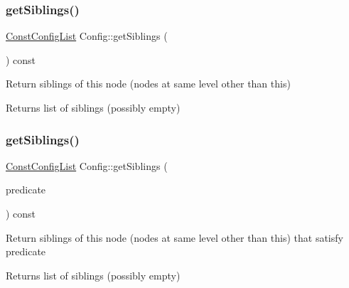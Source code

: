 \subsubsection{\texorpdfstring{get\+Siblings()}{getSiblings()}\hspace{0.1cm}{\footnotesize\ttfamily [1/2]}}
{\footnotesize\ttfamily \hyperlink{classtheoria_1_1config_1_1Config_a61230728ffa4d92667a536c8c0f0ca30}{Const\+Config\+List} Config\+::get\+Siblings (\begin{DoxyParamCaption}{ }\end{DoxyParamCaption}) const}

Return siblings of this node (nodes at same level other than this) \begin{DoxyReturn}{Returns}
list of siblings (possibly empty) 
\end{DoxyReturn}
\mbox{\label{classtheoria_1_1config_1_1Config_abb60532c082c92c628ae49ed3b2e9457}} 
\subsubsection{\texorpdfstring{get\+Siblings()}{getSiblings()}\hspace{0.1cm}{\footnotesize\ttfamily [2/2]}}
{\footnotesize\ttfamily \hyperlink{classtheoria_1_1config_1_1Config_a61230728ffa4d92667a536c8c0f0ca30}{Const\+Config\+List} Config\+::get\+Siblings (\begin{DoxyParamCaption}\item[{const \hyperlink{classtheoria_1_1config_1_1Config_a293ebfd7146d935e232a066f7e6fa279}{Config\+Predicate} \&}]{predicate }\end{DoxyParamCaption}) const}

Return siblings of this node (nodes at same level other than this) that satisfy predicate \begin{DoxyReturn}{Returns}
list of siblings (possibly empty) 
\end{DoxyReturn}
\mbox{\label{classtheoria_1_1config_1_1Config_a01d4128f1f86ad2ff01dfeb3c52c72f4}} 
